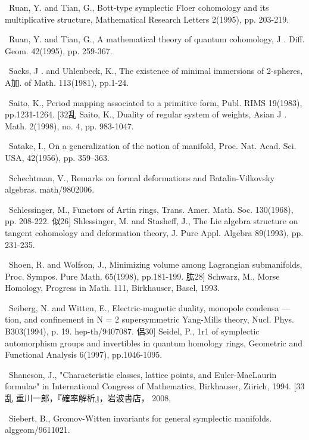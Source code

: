 {\noindent [318]\ Ruan, Y. and Tian, G., Bott-type symplectic Floer cohomology and its multiplicative structure, Mathematical Research Letters 2(1995), pp. 203-219.\par\smallskip
\noindent [319]\ Ruan, Y. and Tian, G., A mathematical theory of quantum cohomology, J . Diff. Geom. 42(1995), pp. 259-367.\par\smallskip
\noindent [320]\ Sacks, J . and Uhlenbeck, K., The existence of minimal immersions of 2-spheres, A加. of Math. 113(1981), pp.1-24.\par\smallskip
\noindent [321]\ Saito, K., Period mapping associated to a primitive form, Publ. RIMS 19(1983), pp.1231-1264. [32乱 Saito, K., Duality of regular system of weights, Asian J . Math. 2(1998), no. 4, pp. 983-1047.\par\smallskip
\noindent [323]\ Satake, I., On a generalization of the notion of manifold, Proc. Nat. Acad. Sci. USA, 42(1956), pp. 359--363.\par\smallskip
\noindent [324]\ Schechtman, V., Remarks on formal deformations and Batalin-Vilkovsky algebras. math/9802006.\par\smallskip
\noindent [325]\ Schlessinger, M., Functors of Artin rings, Trans. Amer. Math. Soc. 130(1968), pp. 208-222. 似26] Shlessinger, M. and Stasheff, J., The Lie algebra structure on tangent cohomology and deformation theory, J. Pure Appl. Algebra 89(1993), pp. 231-235.\par\smallskip
\noindent [327]\ Shoen, R. and Wolfson, J., Minimizing volume among Lagrangian submanifolds, Proc. Sympos. Pure Math. 65(1998), pp.181-199. 肱28] Schwarz, M., Morse Homology, Progress in Math. 111, Birkhauser, Basel, 1993.\par\smallskip
\noindent [329]\ Seiberg, N. and Witten, E., Electric-magnetic duality, monopole condensa — tion, and confinement in N = 2 supersymmetric Yang-Mills theory, Nucl. Phys. B303(1994), p. 19. hep-th/9407087. 侶30] Seidel, P., 1r1 of symplectic automorphism groups and invertibles in quantum homology rings, Geometric and Functional Analysis 6(1997), pp.1046-1095.\par\smallskip
\noindent [331]\ Shaneson, J., "Characteristic classes, lattice points, and Euler-MacLaurin formulae" in International Congress of Mathematics, Birkhauser, Ziirich, 1994. [33乱 重川一郎，『確率解析』，岩波書店， 2008,\par\smallskip
\noindent [333]\ Siebert, B., Gromov-Witten invariants for general symplectic manifolds. alggeom/9611021.\par\smallskip
}
